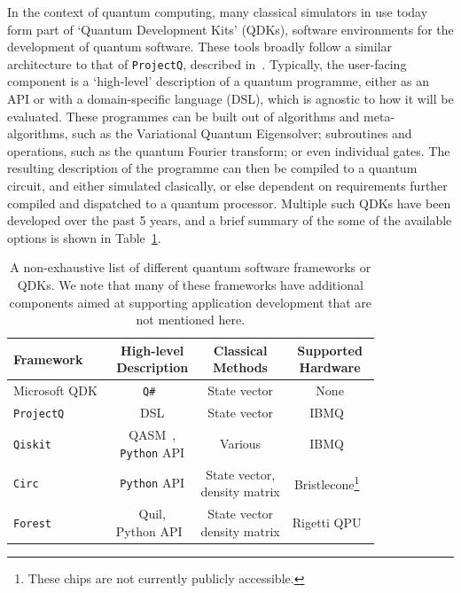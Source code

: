 In the context of quantum computing, many classical simulators in use today form part of `Quantum Development Kits' (QDKs), software environments for the development of quantum software. These tools broadly follow a similar architecture to that of \texttt{ProjectQ}, described in~\cite{Haner2018}. Typically, the user-facing component is a `high-level' description of a quantum programme, either as an API or with a domain-specific language (DSL), which is agnostic to how it will be evaluated. These programmes can be built out of algorithms and meta-algorithms, such as the Variational Quantum Eigensolver; subroutines and operations, such as the quantum Fourier transform; or even individual gates. The resulting description of the programme can then be compiled to a quantum circuit, and either simulated clasically, or else dependent on requirements further compiled and dispatched to a quantum processor. Multiple such QDKs have been developed over the past 5 years, and a brief summary of the some of the available options is shown in Table~\ref{tab:qdks}.
\begin{table}[H]
\begin{tabular}{|l|c|c|c|}
\hline
Framework & \makecell{High-level\\Description} & \makecell{Classical\\ Methods} & \makecell{Supported\\ Hardware} \\ \hline
Microsoft QDK~\cite{MicrosoftQDK} & \texttt{Q\#}~\cite{Svore2018} & State vector & None \\\hline
\texttt{ProjectQ}~\cite{Steiger2016} & DSL & State vector & IBMQ~\cite{IBMQ} \\\hline
\texttt{Qiskit}~\cite{Qiskit} & \makecell{QASM~\cite{Cross2017},\\ \texttt{Python} API} & Various & IBMQ~\cite{IBMQ}\\\hline
\texttt{Circ}~\cite{GoogleCirc} & \texttt{Python} API & \makecell{State vector,\\density matrix} & Bristlecone\footnote{These chips are not currently publicly accessible.}~\cite{CircAnnouncement}\\\hline
\texttt{Forest}~\cite{RigettiForest} & \makecell{Quil,\\ Python API~\cite{Smith2016}} & \makecell{State vector \\ density matrix} & Rigetti QPU~\cite{RigettiQPU}\\ \hline
\end{tabular}
\caption{A non-exhaustive list of different quantum software frameworks or QDKs. We note that many of these frameworks have additional components aimed at supporting application development that are not mentioned here.}\label{tab:qdks}
\end{table}

